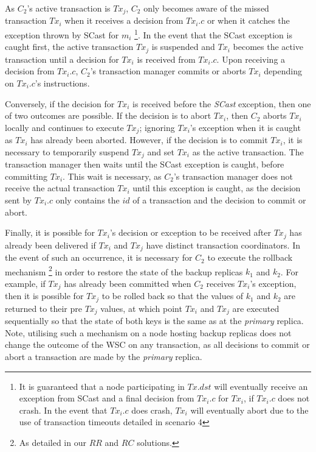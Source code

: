 \begin{description}
         As $C_2$'s active transaction is $Tx_j$, $C_2$ only becomes aware of the missed transaction $Tx_i$ when it receives a decision from $Tx_i.c$ or when it catches the exception thrown by \textsf{SCast} for $m_i$ \footnote{It is guaranteed that a node participating in $Tx.dst$ will eventually receive an exception from \textsf{SCast} and a final decision from $Tx_i.c$ for $Tx_i$, if $Tx_i.c$ does not crash. In the event that $Tx_i.c$ does crash, $Tx_i$ will eventually abort due to the use of transaction timeouts detailed in scenario 4}.  In the event that the \textsf{SCast} exception is caught first, the active transaction $Tx_j$ is suspended and $Tx_i$ becomes the active transaction until a decision for $Tx_i$ is received from $Tx_i.c$.  Upon receiving a decision from $Tx_i.c$, $C_2$'s transaction manager commits or aborts $Tx_i$ depending on $Tx_i.c$'s instructions.  
         
         Conversely, if the decision for $Tx_i$ is received before the \emph{SCast} exception, then one of two outcomes are possible.  If the decision is to abort $Tx_i$, then $C_2$ aborts $Tx_i$ locally and continues to execute $Tx_j$; ignoring $Tx_i$'s exception when it is caught as $Tx_i$ has already been aborted.  However, if the decision is to commit $Tx_i$, it is necessary to temporarily suspend $Tx_j$ and set $Tx_i$ as the active transaction.  The transaction manager then waits until the \textsf{SCast} exception is caught, before committing $Tx_i$.  This wait is necessary, as $C_2$'s transaction manager does not receive the actual transaction $Tx_i$ until this exception is caught, as the decision sent by $Tx_i.c$ only contains the $id$ of a transaction and the decision to commit or abort.  
         
        Finally, it is possible for $Tx_i$'s decision or exception to be received after $Tx_j$ has already been delivered if $Tx_i$ and $Tx_j$ have distinct transaction coordinators.  In the event of such an occurrence, it is necessary for $C_2$ to execute the rollback mechanism \footnote{As detailed in our $RR$ and $RC$ solutions.} in order to restore the state of the backup replicas $k_1$ and $k_2$.  For example, if $Tx_j$ has already been committed when $C_2$ receives $Tx_i$'s exception, then it is possible for $Tx_j$ to be rolled back so that the values of $k_1$ and $k_2$ are returned to their pre $Tx_j$ values, at which point $Tx_i$ and $Tx_j$ are executed sequentially so that the state of both keys is the same as at the \emph{primary} replica.  Note, utilising such a mechanism on a node hosting backup replicas does not change the outcome of the WSC on any transaction, as all decisions to commit or abort a transaction are made by the \emph{primary} replica.  
        

\end{description}
